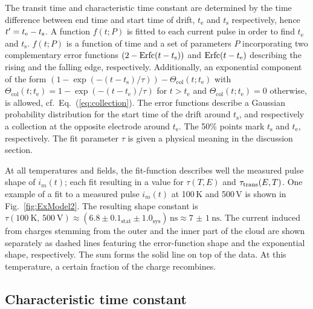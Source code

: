 The transit time and characteristic time constant are determined by the time difference between end time and start time of drift,
 $t_{\text{e}}$ and $t_{\text{s}}$ respectively, hence $\mathnormal{t'} = t_{\text{e}} - t_{\text{s}}$.
A function $f(t;P)$ is fitted to each current pulse in order to find $t_{\text{e}}$ and $t_{\text{s}}$.
$f(t;P)$ is a function of time and a set of parameters $P$ incorporating two complementary error functions $(2-\operatorname{{\textrm{Erfc}}}(t-t_{\text{s}}))$ and $\operatorname{{\textrm{Erfc}}}(t-t_{\text{e}})$
 describing the rising and the falling edge, respectively. 
Additionally, an exponential component  of the form $\left( 1-\exp \left(-(t-t_{\text{s}})/\tau\right) \right) - \Theta_{\textrm{col}}(t;t_{\text{e}})$ with
  $\Theta_{\textrm{col}}(t;t_{\text{e}}) = 1 - \exp \left( -(t-t_{\text{e}})/\tau \right)$ for $t > t_{\text{e}}$ and $\Theta_{\textrm{col}}(t;t_{\text{e}}) = 0$ otherwise,
 is allowed, cf.~Eq.~(\ref{eq:collection}). 
The error functions describe a Gaussian probability distribution for the start time of the drift around $t_{\text{s}}$,
 and respectively a collection at the opposite electrode around $t_{\text{e}}$. 
The 50\% points mark $t_{\text{s}}$ and $t_{\text{e}}$, respectively. 
The fit parameter $\tau$ is given a physical meaning in the discussion section. 

At all temperatures and fields, the fit-function describes well the measured pulse shape of $i_m(t)$;
 each fit resulting in a value for $\tau(T,E)$ and $\tau_\textrm{trans}(E,T)$.
One example of a fit to a measured pulse $i_m(t)$ at 100\,K and 500\,V is shown in Fig.~\ref{fig:ExModel2}. 
The resulting shape constant is $\tau(\SI{100}{\kelvin},\,\SI{500}{\volt}) \approx (\num{6.8}\pm\num{0.1}_{\textrm{stat}}\pm\num{1.0}_{\textrm{sys}})\,\si{\ns} \approx \SI{7(1)}{\ns}$. 
The current induced from charges stemming from the outer and the inner part of the cloud are shown separately as dashed lines
 featuring the error-function shape and the exponential shape, respectively.
The sum forms the solid line on top of the data. 
At this temperature, a certain fraction of the charge recombines. %

\subsection{Characteristic time constant}

